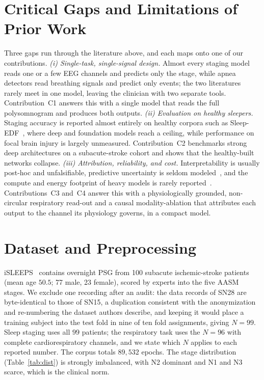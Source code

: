 \documentclass[journal]{IEEEtran}
\begin{document}
\section{Critical Gaps and Limitations of Prior Work}
\label{sec:gaps}
Three gaps run through the literature above, and each maps onto one of our contributions.
\emph{(i) Single-task, single-signal design.} Almost every staging model reads one or a few EEG
channels and predicts only the stage, while apnea detectors read breathing signals and predict
only events; the two literatures rarely meet in one model, leaving the clinician with two
separate tools. Contribution~C1 answers this with a single model that reads the full
polysomnogram and produces both outputs.
\emph{(ii) Evaluation on healthy sleepers.} Staging accuracy is reported almost entirely on
healthy corpora such as Sleep-EDF~\cite{kemp2000sleepedf,goldberger2000physionet}, where deep
and foundation models reach a ceiling, while performance on focal brain injury is largely
unmeasured. Contribution~C2 benchmarks strong deep architectures on a subacute-stroke cohort and
shows that the healthy-built networks collapse.
\emph{(iii) Attribution, reliability, and cost.} Interpretability is usually post-hoc and
unfalsifiable, predictive uncertainty is seldom modeled~\cite{angelopoulos2023conformal}, and the
compute and energy footprint of heavy models is rarely reported~\cite{lacoste2019carbon}.
Contributions~C3 and~C4 answer this with a physiologically grounded, non-circular respiratory
read-out and a causal modality-ablation that attributes each output to the channel its physiology
governs, in a compact model.

\section{Dataset and Preprocessing}
\label{sec:data}
iSLEEPS~\cite{maiti2026isleeps} contains overnight PSG from 100 subacute ischemic-stroke
patients (mean age $50.5$; 77 male, 23 female), scored by experts into the five AASM stages.
We exclude one recording after an audit: the data records of SN28 are byte-identical to those
of SN15, a duplication consistent with the anonymization and re-numbering the dataset authors
describe, and keeping it would place a training subject into the test fold in nine of ten fold
assignments, giving $N=99$. Sleep staging uses all $99$ patients; the respiratory task uses
the $N=96$ with complete cardiorespiratory channels, and we state which $N$ applies to each
reported number. The corpus totals $89{,}532$ epochs. The stage distribution
(Table~\ref{tab:dist}) is strongly imbalanced, with N2 dominant and N1 and N3 scarce, which is
the clinical norm.
\end{document}
